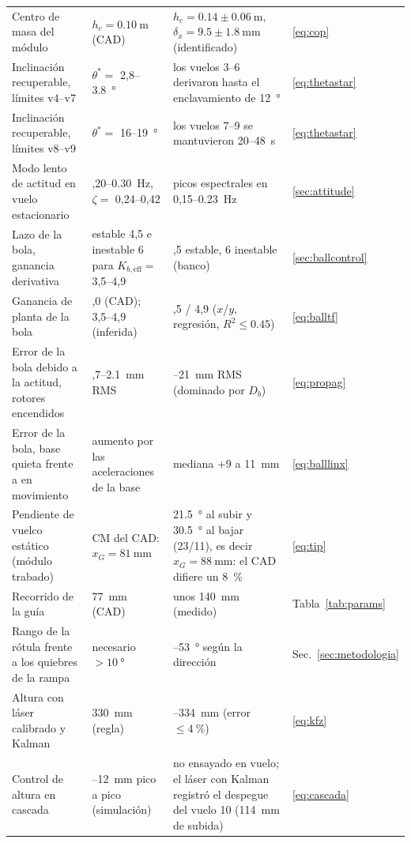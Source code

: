 \begin{small}
\begin{longtable}{@{}>{\raggedright\arraybackslash}p{}>{\raggedright\arraybackslash}p{}>{\raggedright\arraybackslash}p{}>{\raggedright\arraybackslash}p{}@{}}
Centro de masa del módulo & $h_c=\SI{0.10}{\metre}$ (CAD) & $h_c=0.14\pm\SI{0.06}{\metre}$, $\delta_x=9.5\pm\SI{1.8}{\milli\metre}$ (identificado) & \eqref{eq:cop} \\
Inclinación recuperable, límites v4--v7 & $\theta^\ast=$ 2,8--\SI{3.8}{\degree} & los vuelos 3--6 derivaron hasta el enclavamiento de \SI{12}{\degree} & \eqref{eq:thetastar} \\
Inclinación recuperable, límites v8--v9 & $\theta^\ast=$ 16--\SI{19}{\degree} & los vuelos 7--9 se mantuvieron 20--\SI{48}{\second} & \eqref{eq:thetastar} \\
Modo lento de actitud en vuelo estacionario & 0,20--\SI{0.30}{\hertz}, $\zeta=$ 0,24--0,42 & picos espectrales en 0,15--\SI{0.23}{\hertz} & \ref{sec:attitude} \\
Lazo de la bola, ganancia derivativa & estable 4,5 e inestable 6 para $K_{b,\mathrm{eff}}=$ 3,5--4,9 & 4,5 estable, 6 inestable (banco) & \ref{sec:ballcontrol} \\
Ganancia de planta de la bola & 6,0 (CAD); 3,5--4,9 (inferida) & 2,5 / 4,9 ($x$/$y$, regresión, $R^2\le0.45$) & \eqref{eq:balltf} \\
Error de la bola debido a la actitud, rotores encendidos & 1,7--\SI{2.1}{\milli\metre} RMS & 16--\SI{21}{\milli\metre} RMS (dominado por $D_b$) & \eqref{eq:propag} \\
Error de la bola, base quieta frente a en movimiento & aumento por las aceleraciones de la base & mediana +9 a \SI{11}{\milli\metre} & \eqref{eq:balllinx} \\
Pendiente de vuelco estático (módulo trabado) & CM del CAD: $x_G=\SI{81}{\milli\metre}$ & \SI{21.5}{\degree} al subir y \SI{30.5}{\degree} al bajar (23/11), es decir $x_G=\SI{88}{\milli\metre}$: el CAD difiere un \SI{8}{\percent} & \eqref{eq:tip} \\
Recorrido de la guía & \SI{77}{\milli\metre} (CAD) & unos \SI{140}{\milli\metre} (medido) & Tabla~\ref{tab:params} \\
Rango de la rótula frente a los quiebres de la rampa & necesario $>\SI{10}{\degree}$ & 35--\SI{53}{\degree} según la dirección & Sec.~\ref{sec:metodologia} \\
Altura con láser calibrado y Kalman & \SI{330}{\milli\metre} (regla) & 317--\SI{334}{\milli\metre} (error $\le\SI{4}{\percent}$) & \eqref{eq:kfz} \\
Control de altura en cascada & 4--\SI{12}{\milli\metre} pico a pico (simulación) & no ensayado en vuelo; el láser con Kalman registró el despegue del vuelo 10 (\SI{114}{\milli\metre} de subida) & \eqref{eq:cascada} \\

\end{longtable}
\end{small}
